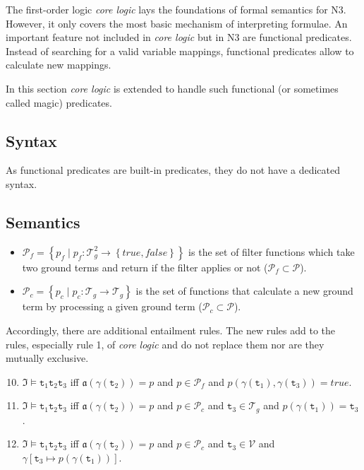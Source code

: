 \documentclass[runningheads]{llncs}
\begin{document}
The first-order logic \emph{core logic} lays the foundations of formal semantics for N3.
However, it only covers the most basic mechanism of interpreting formulae.
An important feature not included in \emph{core logic} but in N3 are functional predicates.
Instead of searching for a valid variable mappings, functional predicates allow to calculate new mappings.

In this section \emph{core logic} is extended to handle such functional (or sometimes called magic) predicates.



\subsection{Syntax}
\label{sec:func-syntax}

As functional predicates are built-in predicates, they do not have a dedicated syntax.



\subsection{Semantics}
\label{sec:func-semantic}

\begin{itemize}
  \item $\mathcal{P}_f = \left\{ p_f \mid p_f: \mathcal{T}_g^2 \rightarrow \left\{true, false\right\} \right\}$ is the set of filter functions which take two ground terms and return if the filter applies or not ($\mathcal{P}_f \subset \mathcal{P}$).
  \item $\mathcal{P}_c = \left\{ p_c \mid p_c: \mathcal{T}_g \rightarrow \mathcal{T}_g \right\}$ is the set of functions that calculate a new ground term by processing a given ground term ($\mathcal{P}_c \subset \mathcal{P}$).
\end{itemize}

\noindent Accordingly, there are additional entailment rules.
The new rules add to the rules, especially rule 1, of \emph{core logic} and do not replace them nor are they mutually exclusive.

\begin{enumerate}
  \setcounter{enumi}{9}
  \item $\mathfrak{I} \vDash \texttt{t}_1 \texttt{t}_2 \texttt{t}_3$ iff $\mathfrak{a}(\gamma(\texttt{t}_2)) = p$ and $p \in \mathcal{P}_f$ and $p(\gamma(\texttt{t}_1), \gamma(\texttt{t}_3) ) = true$.
  \item $\mathfrak{I} \vDash \texttt{t}_1 \texttt{t}_2 \texttt{t}_3$ iff $\mathfrak{a}(\gamma(\texttt{t}_2)) = p$ and $p \in \mathcal{P}_c$ and $\texttt{t}_3 \in \mathcal{T}_g$ and $p(\gamma(\texttt{t}_1)) = \texttt{t}_3$.
  \item $\mathfrak{I} \vDash \texttt{t}_1 \texttt{t}_2 \texttt{t}_3$ iff $\mathfrak{a}(\gamma(\texttt{t}_2)) = p$ and $p \in \mathcal{P}_c$ and $\texttt{t}_3 \in \mathcal{V}$ and $\gamma\left[\texttt{t}_3 \mapsto p(\gamma(\texttt{t}_1))\right]$.
\end{enumerate}
\end{document}
